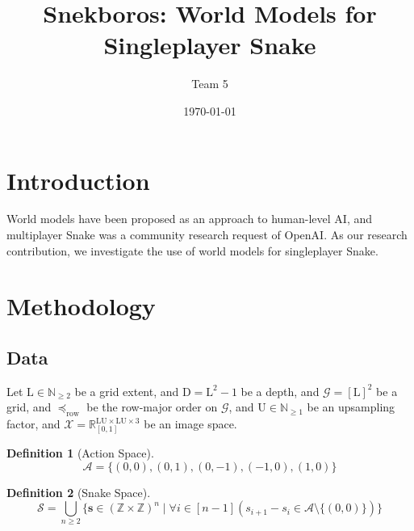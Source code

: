 \documentclass[10pt]{article}
\title{Snekboros: World Models for Singleplayer Snake}
\author{Team 5}
\date{\today}
\theoremstyle{definition}
\newtheorem{definition}{Definition}
\theoremstyle{remark}
\newcommand{\N}{\mathbb{N}}
\newcommand{\R}{\mathbb{R}}
\newcommand{\Z}{\mathbb{Z}}
\begin{document}
\maketitle


\section{Introduction}

World models have been proposed as an approach to human-level AI,
and multiplayer Snake was a community research request of OpenAI.
As our research contribution,
we investigate the use of world models for singleplayer Snake.

\section{Methodology}

\subsection{Data}

Let $\mathrm{L}\in\N_{\geq 2}$ be a grid extent,
and $\mathrm{D}=\mathrm{L}^{2}-1$ be a depth,
and $\mathcal{G}=[\mathrm{L}]^{2}$ be a grid,
and $\preceq_{\mathrm{row}}$ be the row-major order on $\mathcal{G}$,
and $\mathrm{U}\in\N_{\geq 1}$ be an upsampling factor,
and $\mathcal{X}=\R_{[0,1]}^{\mathrm{L}\mathrm{U}\times\mathrm{L}\mathrm{U}\times 3}$ be an image space.

\begin{definition}[Action Space]
$$
	\mathcal{A}=\{(0,0),(0,1),(0,-1),(-1,0),(1,0)\}
$$
\end{definition}

\begin{definition}[Snake Space]
$$
	\mathcal{S}
	=
	\bigcup_{n\geq 2}\{
		\bm{s}\in(\Z\times\Z)^{n}
		\mid
		\forall i\in[n-1](
			s_{i+1}-s_{i}
			\in
			\mathcal{A}
			\setminus
			\{(0,0)\}
		)
	\}
$$
\end{definition}
\end{document}
